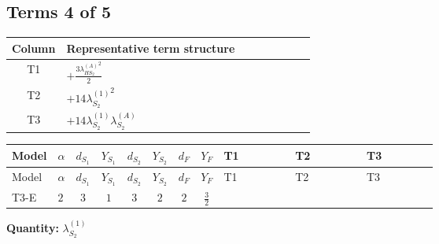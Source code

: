 \documentclass[8pt]{article}
\begin{document}
\begin{landscape}
\subsection*{Terms 4 of 5}
\begin{center}
\begin{tabular}{@{}c >{\raggedright\arraybackslash}p{0.82\linewidth}@{}}
\toprule
Column & Representative term structure \\
\midrule
T1 & \(\displaystyle +\frac{3 {\lambda_{HS_2}^{(A)}}^2}{2}\) \\
\midrule
T2 & \(\displaystyle +14 {\lambda_{S_2}^{(1)}}^2\) \\
\midrule
T3 & \(\displaystyle +14 {\lambda_{S_2}^{(1)}} {\lambda_{S_2}^{(A)}}\) \\
\midrule
\bottomrule
\end{tabular}
\end{center}
\smallskip
\tiny
\begin{longtable}{@{}llcccccc >{\raggedright\arraybackslash}p{0.21\linewidth} >{\raggedright\arraybackslash}p{0.21\linewidth} >{\raggedright\arraybackslash}p{0.21\linewidth}@{}}
\toprule
Model & $\alpha$ & $d_{S_1}$ & $Y_{S_1}$ & $d_{S_2}$ & $Y_{S_2}$ & $d_F$ & $Y_F$ & T1 & T2 & T3 \\
\midrule
\endfirsthead
\toprule
Model & $\alpha$ & $d_{S_1}$ & $Y_{S_1}$ & $d_{S_2}$ & $Y_{S_2}$ & $d_F$ & $Y_F$ & T1 & T2 & T3 \\
\midrule
\endhead
T3-E & $2$ & $3$ & $1$ & $3$ & $2$ & $2$ & $\frac{3}{2}$ & \scriptsize\adjustbox{max width=\linewidth}{$\begin{gathered} +\frac{3 {\lambda_{HS_2}^{(A)}}^2}{2}\end{gathered}$} & \scriptsize\adjustbox{max width=\linewidth}{$\begin{gathered} +14 {\lambda_{S_2}^{(1)}}^2\end{gathered}$} & \scriptsize\adjustbox{max width=\linewidth}{$\begin{gathered} +14 {\lambda_{S_2}^{(1)}} {\lambda_{S_2}^{(A)}}\end{gathered}$} \\
\midrule
\bottomrule
\end{longtable}
\clearpage
\noindent\textbf{Quantity: }$\lambda_{S_2}^{(1)}$\par\smallskip

\end{landscape}
\end{document}
